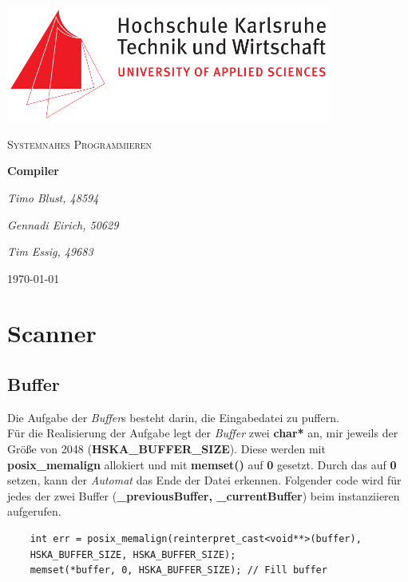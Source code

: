 \documentclass[
a4paper
]{scrreprt}
\begin{document}
	\sffamily %
	
	
	\begin{titlepage}
		\centering
		\includegraphics[width=0.8\textwidth]{./images/logo_hska.png}\par\vspace{1cm}
		\vspace{1cm}
		
		{\scshape\Large Systemnahes Programmieren\par}
		\vspace{1.5cm}
		
		{\huge\textbf{Compiler}\par}
		\vspace{2cm}
		
		{\Large\itshape Timo Blust, 48594\par}
		{\Large\itshape Gennadi Eirich, 50629\par}
		{\Large\itshape Tim Essig, 49683\par}
		
		\vfill
		
		{\large \today\par}
	\end{titlepage}
	
	
	\tableofcontents
	
	\chapter{Scanner}
	\section{Buffer}
	Die Aufgabe der \textit{Buffer}s besteht darin, die Eingabedatei zu puffern.\\
	
	Für die Realisierung der Aufgabe legt der \textit{Buffer} zwei \textbf{char*} an, mir jeweils der Größe von 2048 (\textbf{HSKA\_BUFFER\_SIZE}). 
	Diese werden mit \textbf{posix\_memalign} allokiert und mit \textbf{memset()} auf \textbf{0} gesetzt. Durch das auf \textbf{0} setzen, kann der \textit{Automat} das Ende der Datei erkennen. Folgender code wird für jedes der zwei Buffer (\textbf{\_previousBuffer, \_currentBuffer}) beim instanziieren aufgerufen.
	\begin{lstlisting}
	int err = posix_memalign(reinterpret_cast<void**>(buffer), 
	HSKA_BUFFER_SIZE, HSKA_BUFFER_SIZE);
	memset(*buffer, 0, HSKA_BUFFER_SIZE); // Fill buffer
	\end{lstlisting}
	
\end{document}
